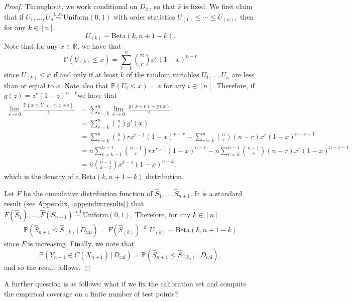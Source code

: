 \documentclass[11pt, titlepage]{article} %
\newcommand{\R}{\mathrm}
\newcommand{\Prob}[1]{\mathbb{P}\left( #1 \right)}
\numberwithin{equation}{section}
\theoremstyle{definition}
\numberwithin{theorem}{section}
\numberwithin{lemma}{section}
\numberwithin{corollary}{section}
\numberwithin{proposition}{section}
\numberwithin{definition}{section}
\numberwithin{remark}{section}
\begin{document}
\begin{proof}
    Throughout, we work conditional on \(D_\R{tr}\), so that \(\hat{s}\) is fixed. We first claim that if \(U_1, \ldots, U_n \overset{\R{i.i.d.}}{\sim} \R{Uniform}(0,1)\) with order statistics \(U_{(1)} \leq \cdots \leq U_{(n)}, \) then for any \(k \in [n]\), \[U_{(k)} \sim \R{Beta}(k, n+1-k).\] Note that for any \(x \in \mathbb{R}\), we have that \[\Prob{U_{(k)} \leq x} = \sum_{r=k}^{n} \binom{n}{r} x^r (1-x)^{n-r}\] since \(U_{(k)} \leq x\) if and only if at least \(k\) of the random variables \(U_1, \ldots, U_n\) are less than or equal to \(x\). Note also that \(\Prob{U_i \leq x} = x\) for any \(i \in [n]\). Therefore, if \(g(z) = z^r (1-z)^{n-r}\)we have that \begin{align*}
        \lim_{\epsilon \to 0} \frac{\Prob{x \leq U_{(k)} \leq x+\epsilon}}{\epsilon} &= \sum_{r=k}^{n} \lim_{\epsilon \to 0} \, \frac{g(x+\epsilon) - g(x)}{\epsilon} \\
        &= \sum_{r=k}^{n} \binom{n}{r} g'(x) \\
        &= \sum_{r=k}^{n} \binom{n}{r} r x^{r-1}(1-x)^{n-r} - \sum_{r=k}^{n} \binom{n}{r} (n-r) x^{r}(1-x)^{n-r-1} \\
        &= n \sum_{r=k-1}^{n-1} \binom{n-1}{r} r x^{r-1}(1-x)^{n-r} -  n \sum_{r=k}^{n-1} \binom{n-1}{r} (n-r) x^{r}(1-x)^{n-r-1} \\
        &= n \binom{n-1}{k-1} x^{k-1}(1-x)^{n-k},
    \end{align*}
    which is the density of a \(\R{Beta}(k, n+1-k)\) distribution. \vskip5pt

    \noindent
    Let \(F\) be the cumulative distribution function of \(\hat{S}_1, \ldots, \hat{S}_{n+1}.\) It is a standard result (see Appendix, \cref{appendix:results}) that \(F(\hat{S}_1), \ldots, \hat{F}(S_{n+1}) \overset{\R{i.i.d.}}{\sim} \R{Uniform}(0,1).\) Therefore, for any \(k \in [n]\) \begin{align*}
        \Prob{\hat{S}_{n+1} \leq \hat{S}_{(k)} \, | \, D_\R{cal}} = F(\hat{S}_{(k)}) \overset{\R{d}}{=} U_{(k)} \sim \R{Beta}(k, n+1-k)
    \end{align*} since \(F\) is increasing. Finally, we note that \[\Prob{Y_{n+1} \in C(X_{n+1}) \, | \, D_\R{cal}} = \Prob{\hat{S}_{n+1} \leq \hat{S}_{(k_\alpha)} \, | \, D_\R{cal}}, \] and so the result follows.
\end{proof}

\noindent
A further question is as follows: what if we fix the calibration set and compute the empirical coverage on a finite number of test points? \vskip5pt
\end{document}
